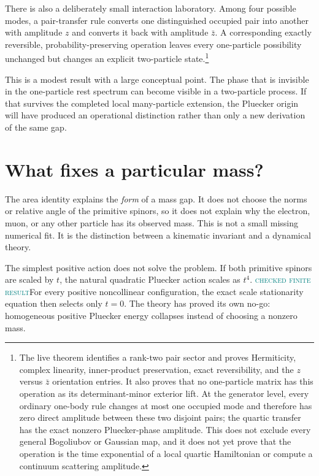 \documentclass[11pt]{article}
\newcommand{\Mlabel}{\textcolor{teal}{\textsc{checked finite result}}}
\begin{document}
There is also a deliberately small interaction laboratory.  Among four
possible modes, a pair-transfer rule converts one distinguished occupied pair
into another with amplitude $z$ and converts it back with amplitude $\bar z$.
A corresponding exactly reversible, probability-preserving operation leaves
every one-particle possibility unchanged but changes an explicit two-particle
state.\footnote{The live theorem identifies a
rank-two pair sector and proves Hermiticity, complex linearity, inner-product
preservation, exact reversibility, and the $z$ versus $\bar z$ orientation
entries.  It also proves that no one-particle matrix has this operation as its
determinant-minor exterior lift.  At the generator level, every ordinary
one-body rule changes at most one occupied mode and therefore has zero direct
amplitude between these two disjoint pairs; the quartic transfer has the exact
nonzero Pluecker-phase amplitude.  This does not exclude every general
Bogoliubov or Gaussian map, and it does not yet prove that the operation is the
time exponential of a local quartic Hamiltonian or compute a continuum
scattering amplitude.}

This is a modest result with a large conceptual point.  The phase that is
invisible in the one-particle rest spectrum can become visible in a
two-particle process.  If that survives the completed local many-particle extension,
the Pluecker origin will have produced an operational distinction rather than
only a new derivation of the same gap.

\section{What fixes a particular mass?}

The area identity explains the \emph{form} of a mass gap.  It does not choose
the norms or relative angle of the primitive spinors, so it does not explain
why the electron, muon, or any other particle has its observed mass.  This is
not a small missing numerical fit.  It is the distinction between a kinematic
invariant and a dynamical theory.

The simplest positive action does not solve the problem.  If both primitive
spinors are scaled by $t$, the natural quadratic Pluecker action scales as
$t^4$.  \Mlabel\quad For every positive noncollinear configuration, the exact
scale stationarity equation then selects only $t=0$.  The theory has proved its
own no-go: homogeneous positive Pluecker energy collapses instead of choosing a
nonzero mass.
\end{document}
